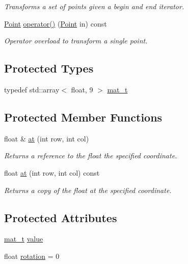 \begin{DoxyCompactItemize}
\begin{DoxyCompactList}\small\item\em Transforms a set of points given a begin and end iterator. \end{DoxyCompactList}\item 
\hyperlink{structcturtle_1_1ivec2}{Point} \hyperlink{classcturtle_1_1Transform_afc24321e5d8da21c310fd830aa76da84}{operator()} (\hyperlink{structcturtle_1_1ivec2}{Point} in) const
\begin{DoxyCompactList}\small\item\em Operator overload to transform a single point. \end{DoxyCompactList}\end{DoxyCompactItemize}
\subsection*{Protected Types}
\begin{DoxyCompactItemize}
\item 
typedef std\+::array$<$ float, 9 $>$ \hyperlink{classcturtle_1_1Transform_a2952f427614626cb6b72553fb8451d8a}{mat\+\_\+t}
\end{DoxyCompactItemize}
\subsection*{Protected Member Functions}
\begin{DoxyCompactItemize}
\item 
float \& \hyperlink{classcturtle_1_1Transform_a640a1e38d034eb0b3878c4c56f014dd2}{at} (int row, int col)
\begin{DoxyCompactList}\small\item\em Returns a reference to the float the specified coordinate. \end{DoxyCompactList}\item 
float \hyperlink{classcturtle_1_1Transform_af6ab44503dfb32a56bbce3c8b2b5ea97}{at} (int row, int col) const
\begin{DoxyCompactList}\small\item\em Returns a copy of the float at the specified coordinate. \end{DoxyCompactList}\end{DoxyCompactItemize}
\subsection*{Protected Attributes}
\begin{DoxyCompactItemize}
\item 
\hyperlink{classcturtle_1_1Transform_a2952f427614626cb6b72553fb8451d8a}{mat\+\_\+t} \hyperlink{classcturtle_1_1Transform_a747be70a22109ecf9470c7ad75565c0c}{value}
\item 
float \hyperlink{classcturtle_1_1Transform_a79f7e11fb2b3d1093458100783cdd984}{rotation} = 0
\end{DoxyCompactItemize}



